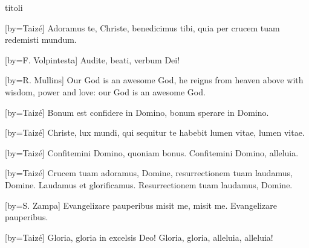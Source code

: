 \begin{songs}{titoli}

[by={Taizé}]
\beginverse*
Adoramus te, Christe, benedicimus tibi,
quia per crucem tuam redemisti mundum.
\endverse
\endsong

[by={F. Volpintesta}]
\beginverse*
Audite, beati, verbum Dei!
\endverse
\endsong

[by={R. Mullins}]
\beginverse*
Our God is an awesome God,
he reigns from heaven above
with wisdom, power and love:
our God is an awesome God.
\endverse
\endsong

[by={Taizé}]
\beginverse*
Bonum est confidere in Domino,
bonum sperare in Domino.
\endverse
\endsong

[by={Taizé}]
\beginverse*
Christe, lux mundi,
qui sequitur te
habebit lumen vitae, lumen vitae.
\endverse
\endsong

[by={Taizé}]
\beginverse*
Confitemini Domino, quoniam bonus.
Confitemini Domino, alleluia.
\endverse
\endsong

[by={Taizé}]
\beginverse*
Crucem tuam adoramus, Domine,
resurrectionem tuam laudamus, Domine.
Laudamus et glorificamus.
Resurrectionem tuam laudamus, Domine.
\endverse
\endsong

[by={S. Zampa}]
\beginverse*
Evangelizare pauperibus
misit me, misit me.
Evangelizare pauperibus.
\endverse
\endsong

[by={Taizé}]
\beginverse*
Gloria, gloria in excelsis Deo!
Gloria, gloria, alleluia, alleluia!
\endverse
\endsong


\end{songs}
